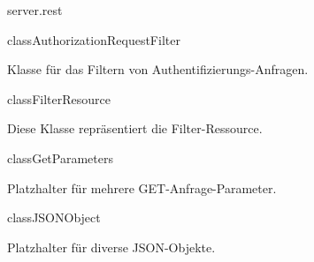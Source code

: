 \begin{texdocpackage}{server.rest}
\label{texdoclet:edu.kit.informatik.studyplan.server.rest}

\begin{texdocclass}{class}{AuthorizationRequestFilter}
\label{texdoclet:edu.kit.informatik.studyplan.server.rest.AuthorizationRequestFilter}
\begin{texdocclassintro}
Klasse für das Filtern von Authentifizierungs-Anfragen.\end{texdocclassintro}
\begin{texdocclassconstructors}
\end{texdocclassconstructors}
\begin{texdocclassmethods}
\end{texdocclassmethods}
\end{texdocclass}


\begin{texdocclass}{class}{FilterResource}
\label{texdoclet:edu.kit.informatik.studyplan.server.rest.FilterResource}
\begin{texdocclassintro}
Diese Klasse repräsentiert die Filter-Ressource.\end{texdocclassintro}
\begin{texdocclassconstructors}
\end{texdocclassconstructors}
\begin{texdocclassmethods}
\end{texdocclassmethods}
\end{texdocclass}


\begin{texdocclass}{class}{GetParameters}
\label{texdoclet:edu.kit.informatik.studyplan.server.rest.GetParameters}
\begin{texdocclassintro}
Platzhalter für mehrere GET-Anfrage-Parameter.\end{texdocclassintro}
\end{texdocclass}


\begin{texdocclass}{class}{JSONObject}
\label{texdoclet:edu.kit.informatik.studyplan.server.rest.JSONObject}
\begin{texdocclassintro}
Platzhalter für diverse JSON-Objekte.\end{texdocclassintro}
\end{texdocclass}



\end{texdocpackage}
